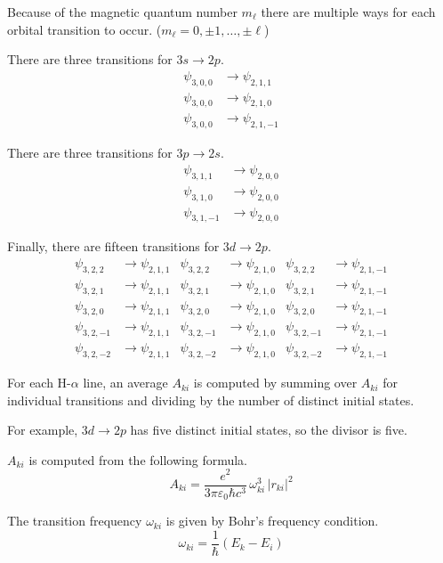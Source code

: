 \documentclass[12pt]{article}
\begin{document}
Because of the magnetic quantum number $m_\ell$
there are multiple ways for each orbital transition to occur.
($m_\ell=0,\pm1,\ldots,\pm\ell$)

\bigskip
There are three transitions for $3s\rightarrow2p$.
\begin{align*}
\psi_{3,0,0}&\rightarrow\psi_{2,1,1}
\\
\psi_{3,0,0}&\rightarrow\psi_{2,1,0}
\\
\psi_{3,0,0}&\rightarrow\psi_{2,1,-1}
\end{align*}

There are three transitions for $3p\rightarrow2s$.
\begin{align*}
\psi_{3,1,1}&\rightarrow\psi_{2,0,0}
\\
\psi_{3,1,0}&\rightarrow\psi_{2,0,0}
\\
\psi_{3,1,-1}&\rightarrow\psi_{2,0,0}
\end{align*}

Finally, there are fifteen transitions for $3d\rightarrow2p$.
\begin{align*}
\psi_{3,2,2}&\rightarrow\psi_{2,1,1} &
\psi_{3,2,2}&\rightarrow\psi_{2,1,0} &
\psi_{3,2,2}&\rightarrow\psi_{2,1,-1}
\\
\psi_{3,2,1}&\rightarrow\psi_{2,1,1} &
\psi_{3,2,1}&\rightarrow\psi_{2,1,0} &
\psi_{3,2,1}&\rightarrow\psi_{2,1,-1}
\\
\psi_{3,2,0}&\rightarrow\psi_{2,1,1} &
\psi_{3,2,0}&\rightarrow\psi_{2,1,0} &
\psi_{3,2,0}&\rightarrow\psi_{2,1,-1}
\\
\psi_{3,2,-1}&\rightarrow\psi_{2,1,1} &
\psi_{3,2,-1}&\rightarrow\psi_{2,1,0} &
\psi_{3,2,-1}&\rightarrow\psi_{2,1,-1}
\\
\psi_{3,2,-2}&\rightarrow\psi_{2,1,1} &
\psi_{3,2,-2}&\rightarrow\psi_{2,1,0} &
\psi_{3,2,-2}&\rightarrow\psi_{2,1,-1}
\end{align*}

For each H-$\alpha$ line, an average $A_{ki}$ is computed by summing over $A_{ki}$ for individual transitions
and dividing by the number of distinct initial states.

\bigskip
For example, $3d\rightarrow2p$ has five distinct initial states, so the divisor is five.

\bigskip
$A_{ki}$ is computed from the following formula.
\begin{equation*}
A_{ki}=\frac{e^2}{3\pi\varepsilon_0\hbar c^3}\,\omega_{ki}^3\,|r_{ki}|^2
\end{equation*}

The transition frequency $\omega_{ki}$ is given by Bohr's frequency condition.
\begin{equation*}
\omega_{ki}=\frac{1}{\hbar}(E_k-E_i)
\end{equation*}
\end{document}
